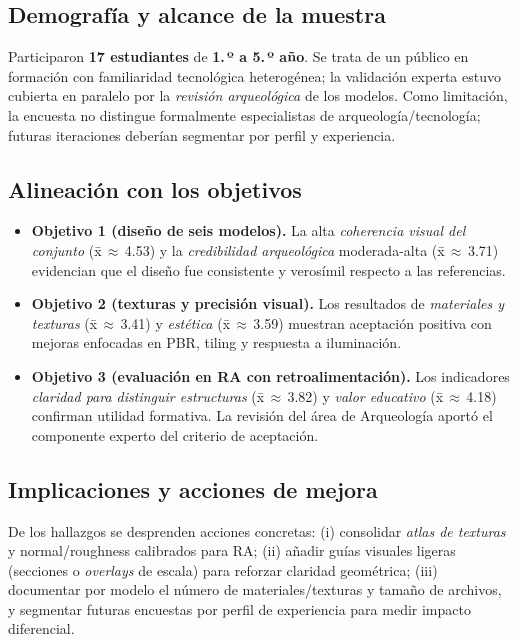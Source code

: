 \subsection{Demografía y alcance de la muestra}
Participaron \textbf{17 estudiantes} de \textbf{1.\,º a 5.\,º año}. Se trata de un público en formación con familiaridad tecnológica heterogénea; la validación experta estuvo cubierta en paralelo por la \emph{revisión arqueológica} de los modelos. Como limitación, la encuesta no distingue formalmente especialistas de arqueología/tecnología; futuras iteraciones deberían segmentar por perfil y experiencia.

\subsection{Alineación con los objetivos}
\begin{itemize}
  \item \textbf{Objetivo 1 (diseño de seis modelos).} La alta \emph{coherencia visual del conjunto} (\={x}\,$\approx$\,4.53) y la \emph{credibilidad arqueológica} moderada-alta (\={x}\,$\approx$\,3.71) evidencian que el diseño fue consistente y verosímil respecto a las referencias.
  \item \textbf{Objetivo 2 (texturas y precisión visual).} Los resultados de \emph{materiales y texturas} (\={x}\,$\approx$\,3.41) y \emph{estética} (\={x}\,$\approx$\,3.59) muestran aceptación positiva con mejoras enfocadas en PBR, tiling y respuesta a iluminación.
  \item \textbf{Objetivo 3 (evaluación en RA con retroalimentación).} Los indicadores \emph{claridad para distinguir estructuras} (\={x}\,$\approx$\,3.82) y \emph{valor educativo} (\={x}\,$\approx$\,4.18) confirman utilidad formativa. La revisión del área de Arqueología aportó el componente experto del criterio de aceptación.
\end{itemize}

\subsection{Implicaciones y acciones de mejora}
De los hallazgos se desprenden acciones concretas: (i) consolidar \emph{atlas de texturas} y normal/roughness calibrados para RA; (ii) añadir guías visuales ligeras (secciones o \emph{overlays} de escala) para reforzar claridad geométrica; (iii) documentar por modelo el número de materiales/texturas y tamaño de archivos, y segmentar futuras encuestas por perfil de experiencia para medir impacto diferencial.


